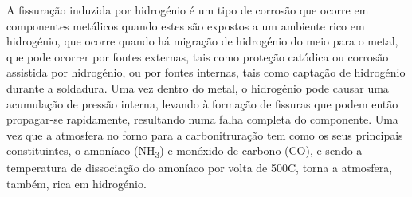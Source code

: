 A fissuração induzida por hidrogénio é um tipo de corrosão que ocorre em componentes metálicos quando estes são expostos a um ambiente rico em hidrogénio, que ocorre quando há migração de hidrogénio do meio para o metal, que pode ocorrer por fontes externas, tais como proteção catódica ou corrosão assistida por hidrogénio, ou por fontes internas, tais como captação de hidrogénio durante a soldadura. Uma vez dentro do metal, o hidrogénio pode causar uma acumulação de pressão interna, levando à formação de fissuras que podem então propagar-se rapidamente, resultando numa falha completa do componente. Uma vez que a atmosfera no forno para a carbonitruração tem como os seus principais constituintes, o amoníaco (NH\textsubscript{3}) e monóxido de carbono (CO), e sendo a temperatura de dissociação do amoníaco por volta de 500\textdegree C, torna a atmosfera, também, rica em hidrogénio.
